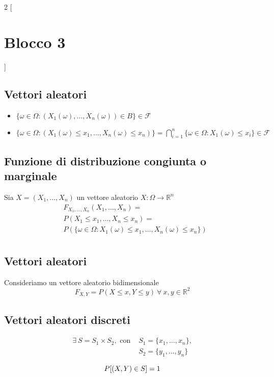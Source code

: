 \begin{multicols*}{2}
[\section*{Blocco 3}]
    
\subsection*{Vettori aleatori}
\begin{itemize}
    \item $\{\omega \in \Omega : (X_1(\omega),\dots,X_n(\omega)) \in B\} \in \mathscr{F}$
    \item $\{\omega \in \Omega : (X_1(\omega) \le x_1, \dots, X_n(\omega) \le x_n)\}
        = \displaystyle \bigcap_{i=1}^{n}\{\omega \in \Omega : X_1(\omega) \le x_i\} \in \mathscr{F}$
\end{itemize}

\subsection*{Funzione di distribuzione congiunta o marginale}
Sia $X = (X_1,\dots,X_n)$ un vettore aleatorio $X: \Omega \to \mathbb{R}^n$ 
\begin{align*}
&F_{X_1,\dots,X_n}(X_1,\dots,X_n) = \\
&P(X_1 \le x_1, \dots, X_n \le x_n) = \\
&P(\{\omega \in \Omega : X_1(\omega) \le x_1, \dots, X_n(\omega) \le x_n\})\\
\end{align*}

\subsection*{Vettori aleatori}
Consideriamo un vettore aleatorio bidimensionale
$$
F_{X,Y} = P(X \le x, Y \le y) \ \forall \ x,y \in \mathbb{R}^2
$$

\subsection*{Vettori aleatori discreti}
\begin{align*}
\exists \ S = S_1 \times S_2, \text{ con } &S_1 = \{x_1,\dots,x_n\},
\\&S_2 = \{y_1,\dots,y_n\}
\end{align*}

$$
P[(X,Y) \in S] = 1\\
$$


\end{multicols*}
